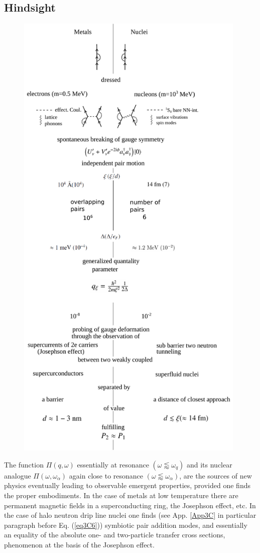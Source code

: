 \begin{subappendices}
\subsection{Hindsight}
         \begin{figure}
         	\centerline{\includegraphics*[width=11cm,angle=0	]{nutshell/figs/fig3B4x}}
         	\caption{}\label{fig3B4x}
         \end{figure}
The function $\Pi(q,\omega)$ essentially at resonance $(\omega\lessapprox\omega_q)$ and its nuclear analogue  $\Pi(\omega,\omega_\alpha)$ again close to resonance $(\omega\lessapprox\omega_\alpha)$, are the sources of new physics eventually leading to observable emergent properties, provided one finds the  proper embodiments. In the case of metals at low temperature there are permanent magnetic fields in a superconducting ring, the Josephson effect, etc. In the case of halo neutron drip line nuclei one finds (see App. \ref{App3C} in particular paragraph before Eq. (\ref{eq3C6})) symbiotic pair addition modes,  and  essentially an equality of the absolute one- and two-particle transfer cross sections, phenomenon at the basis of the Josephson effect. 




\end{subappendices}
